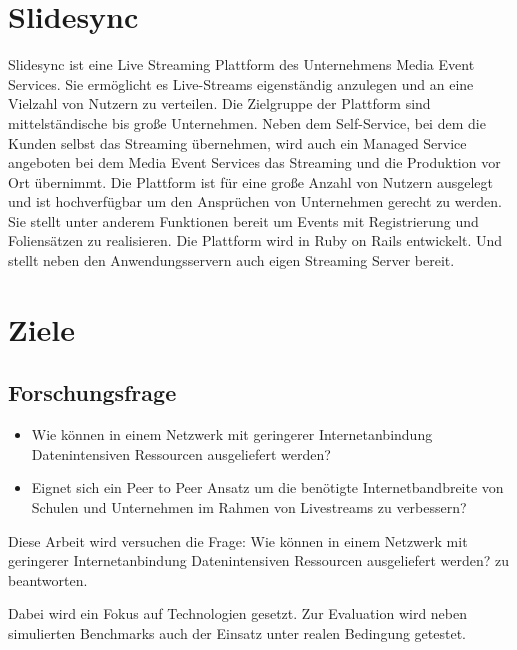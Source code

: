 \section{Slidesync}
Slidesync ist eine Live Streaming Plattform des Unternehmens Media Event Services. Sie ermöglicht es Live-Streams eigenständig anzulegen und an eine Vielzahl von Nutzern zu verteilen. Die Zielgruppe der Plattform sind mittelständische bis große Unternehmen. Neben dem Self-Service, bei dem die Kunden selbst das Streaming übernehmen, wird auch ein Managed Service angeboten bei dem Media Event Services das Streaming und die Produktion vor Ort übernimmt. Die Plattform ist für eine große Anzahl von Nutzern ausgelegt und ist hochverfügbar um den Ansprüchen von Unternehmen gerecht zu werden. Sie stellt unter anderem Funktionen bereit um Events mit Registrierung und Foliensätzen zu realisieren. Die Plattform wird in Ruby on Rails entwickelt. Und stellt neben den Anwendungsservern auch eigen Streaming Server bereit.

\section{Ziele}
\subsection{Forschungsfrage}
\begin{itemize}
	\item Wie können in einem Netzwerk mit geringerer Internetanbindung Datenintensiven Ressourcen ausgeliefert werden?
	\item Eignet sich ein Peer to Peer Ansatz um die benötigte Internetbandbreite von Schulen und Unternehmen im Rahmen von Livestreams zu verbessern?
\end{itemize}
Diese Arbeit wird versuchen die Frage: 
Wie können in einem Netzwerk mit geringerer Internetanbindung Datenintensiven Ressourcen ausgeliefert werden? 
zu beantworten.

Dabei wird ein Fokus auf \pTp Technologien gesetzt. Zur Evaluation wird neben simulierten Benchmarks auch der Einsatz unter realen Bedingung getestet.  

